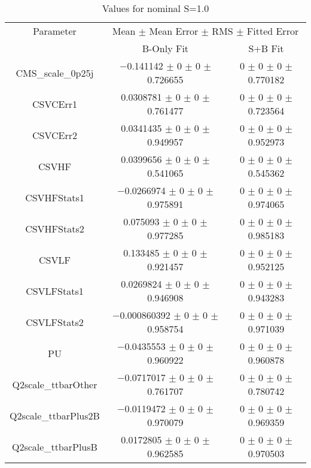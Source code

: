 \begin{table}
\centering
\caption{Values for nominal S=1.0}
\begin{tabular}{ccc}
\toprule
Parameter & \multicolumn{2}{c}{Mean $\pm$ Mean Error $\pm$ RMS $\pm$ Fitted Error}\\
 & B-Only Fit & S+B Fit\\
\midrule
CMS\_scale\_0p25j & \num{-0.141142} $\pm$ \num{0} $\pm$ \num{0} $\pm$ \num{0.726655} & \num{0} $\pm$ \num{0} $\pm$ \num{0} $\pm$ \num{0.770182}\\
CSVCErr1 & \num{0.0308781} $\pm$ \num{0} $\pm$ \num{0} $\pm$ \num{0.761477} & \num{0} $\pm$ \num{0} $\pm$ \num{0} $\pm$ \num{0.723564}\\
CSVCErr2 & \num{0.0341435} $\pm$ \num{0} $\pm$ \num{0} $\pm$ \num{0.949957} & \num{0} $\pm$ \num{0} $\pm$ \num{0} $\pm$ \num{0.952973}\\
CSVHF & \num{0.0399656} $\pm$ \num{0} $\pm$ \num{0} $\pm$ \num{0.541065} & \num{0} $\pm$ \num{0} $\pm$ \num{0} $\pm$ \num{0.545362}\\
CSVHFStats1 & \num{-0.0266974} $\pm$ \num{0} $\pm$ \num{0} $\pm$ \num{0.975891} & \num{0} $\pm$ \num{0} $\pm$ \num{0} $\pm$ \num{0.974065}\\
CSVHFStats2 & \num{0.075093} $\pm$ \num{0} $\pm$ \num{0} $\pm$ \num{0.977285} & \num{0} $\pm$ \num{0} $\pm$ \num{0} $\pm$ \num{0.985183}\\
CSVLF & \num{0.133485} $\pm$ \num{0} $\pm$ \num{0} $\pm$ \num{0.921457} & \num{0} $\pm$ \num{0} $\pm$ \num{0} $\pm$ \num{0.952125}\\
CSVLFStats1 & \num{0.0269824} $\pm$ \num{0} $\pm$ \num{0} $\pm$ \num{0.946908} & \num{0} $\pm$ \num{0} $\pm$ \num{0} $\pm$ \num{0.943283}\\
CSVLFStats2 & \num{-0.000860392} $\pm$ \num{0} $\pm$ \num{0} $\pm$ \num{0.958754} & \num{0} $\pm$ \num{0} $\pm$ \num{0} $\pm$ \num{0.971039}\\
PU & \num{-0.0435553} $\pm$ \num{0} $\pm$ \num{0} $\pm$ \num{0.960922} & \num{0} $\pm$ \num{0} $\pm$ \num{0} $\pm$ \num{0.960878}\\
Q2scale\_ttbarOther & \num{-0.0717017} $\pm$ \num{0} $\pm$ \num{0} $\pm$ \num{0.761707} & \num{0} $\pm$ \num{0} $\pm$ \num{0} $\pm$ \num{0.780742}\\
Q2scale\_ttbarPlus2B & \num{-0.0119472} $\pm$ \num{0} $\pm$ \num{0} $\pm$ \num{0.970079} & \num{0} $\pm$ \num{0} $\pm$ \num{0} $\pm$ \num{0.969359}\\
Q2scale\_ttbarPlusB & \num{0.0172805} $\pm$ \num{0} $\pm$ \num{0} $\pm$ \num{0.962585} & \num{0} $\pm$ \num{0} $\pm$ \num{0} $\pm$ \num{0.970503}\\

\end{tabular}
\end{table}
